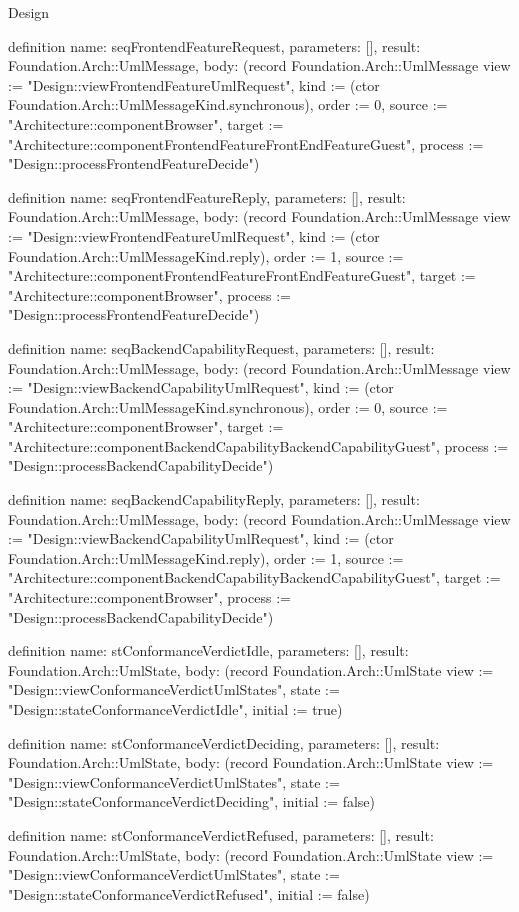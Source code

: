\begin{lexlean}{Design}
\begin{semanticmodule}
definition{
  name: seqFrontendFeatureRequest,
  parameters: [],
  result: Foundation.Arch::UmlMessage,
  body: (record Foundation.Arch::UmlMessage {view := "Design::viewFrontendFeatureUmlRequest", kind := (ctor Foundation.Arch::UmlMessageKind.synchronous), order := 0, source := "Architecture::componentBrowser", target := "Architecture::componentFrontendFeatureFrontEndFeatureGuest", process := "Design::processFrontendFeatureDecide"})
}

definition{
  name: seqFrontendFeatureReply,
  parameters: [],
  result: Foundation.Arch::UmlMessage,
  body: (record Foundation.Arch::UmlMessage {view := "Design::viewFrontendFeatureUmlRequest", kind := (ctor Foundation.Arch::UmlMessageKind.reply), order := 1, source := "Architecture::componentFrontendFeatureFrontEndFeatureGuest", target := "Architecture::componentBrowser", process := "Design::processFrontendFeatureDecide"})
}

definition{
  name: seqBackendCapabilityRequest,
  parameters: [],
  result: Foundation.Arch::UmlMessage,
  body: (record Foundation.Arch::UmlMessage {view := "Design::viewBackendCapabilityUmlRequest", kind := (ctor Foundation.Arch::UmlMessageKind.synchronous), order := 0, source := "Architecture::componentBrowser", target := "Architecture::componentBackendCapabilityBackendCapabilityGuest", process := "Design::processBackendCapabilityDecide"})
}

definition{
  name: seqBackendCapabilityReply,
  parameters: [],
  result: Foundation.Arch::UmlMessage,
  body: (record Foundation.Arch::UmlMessage {view := "Design::viewBackendCapabilityUmlRequest", kind := (ctor Foundation.Arch::UmlMessageKind.reply), order := 1, source := "Architecture::componentBackendCapabilityBackendCapabilityGuest", target := "Architecture::componentBrowser", process := "Design::processBackendCapabilityDecide"})
}

definition{
  name: stConformanceVerdictIdle,
  parameters: [],
  result: Foundation.Arch::UmlState,
  body: (record Foundation.Arch::UmlState {view := "Design::viewConformanceVerdictUmlStates", state := "Design::stateConformanceVerdictIdle", initial := true})
}

definition{
  name: stConformanceVerdictDeciding,
  parameters: [],
  result: Foundation.Arch::UmlState,
  body: (record Foundation.Arch::UmlState {view := "Design::viewConformanceVerdictUmlStates", state := "Design::stateConformanceVerdictDeciding", initial := false})
}

definition{
  name: stConformanceVerdictRefused,
  parameters: [],
  result: Foundation.Arch::UmlState,
  body: (record Foundation.Arch::UmlState {view := "Design::viewConformanceVerdictUmlStates", state := "Design::stateConformanceVerdictRefused", initial := false})
}


\end{semanticmodule}
\end{lexlean}

